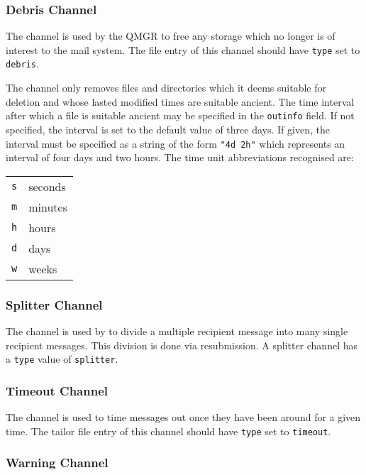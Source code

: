 \subsubsection	{Debris Channel}

The  channel is used by the QMGR to free any storage which
no longer is of interest to the mail system.  The  file
entry of this channel should have \verb+type+ set to
\verb+debris+.

The  channel only removes files and directories which it
deems suitable for deletion and whose lasted modified times are
suitable ancient. The time interval after which a file is suitable
ancient may be specified in the \verb+outinfo+ field.
If not specified, the interval is set to the default value of three days.
If given, the interval must be specified as a string of the form
\verb+"4d 2h"+ which represents an interval of four days and two hours.
The time unit abbreviations recognised are:
\begin{tabular}{l l}
\tt s& seconds \\
\tt m& minutes \\
\tt h& hours \\
\tt d& days \\
\tt w& weeks \\
\end{tabular}

\subsubsection {Splitter Channel}

The  channel is used by  to divide a multiple
recipient message into many single recipient messages.
This division is done via resubmission. A splitter channel has
a \verb|type| value of \verb|splitter|.

\subsubsection	{Timeout Channel}

The  channel is used to time messages out once they have been
around for a given time.  The tailor file entry of this channel should
have \verb+type+ set to \verb+timeout+.

\subsubsection	{Warning Channel}


